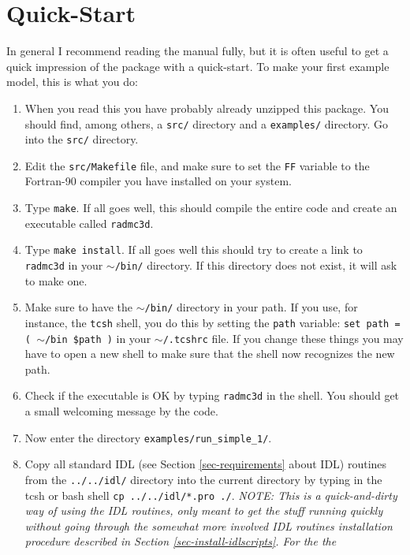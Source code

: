 \documentclass{report}
\begin{document}
\chapter{Quick-Start}\label{chap-quick-start}
In general I recommend reading the manual fully, but it is often useful
to get a quick impression of the package with a quick-start. To make your
first example model, this is what you do:
\begin{enumerate}
\item When you read this you have probably already unzipped this package.
  You should find, among others, a {\small\tt src/} directory and a
  {\small\tt examples/} directory. Go into the {\small\tt src/} directory.
\item Edit the {\small\tt src/Makefile} file, and make sure to set the
  {\small\tt FF} variable to the Fortran-90 compiler you have installed on
  your system.
\item Type {\small\tt make}. If all goes well, this should compile the
  entire code and create an executable called {\small\tt radmc3d}.
\item Type {\small\tt make install}. If all goes well this should try to
  create a link to {\small\tt radmc3d} in your {\small\tt $\sim$/bin/}
  directory. If this directory does not exist, it will ask to make one.
\item Make sure to have the {\small\tt $\sim$/bin/} directory in your path.
  If you use, for instance, the {\small\tt tcsh} shell, you do this by
  setting the {\small\tt path} variable: {\small\tt set path = ( $\sim$/bin
    \$path )} in your {\small\tt $\sim$/.tcshrc} file. If you change these
  things you may have to open a new shell to make sure that the shell now
  recognizes the new path.
\item Check if the executable is OK by typing {\small\tt radmc3d} in the
  shell. You should get a small welcoming message by the code.
\item Now enter the directory {\small\tt examples/run\_simple\_1/}. 
\item Copy all standard IDL (see Section \ref{sec-requirements} about IDL)
  routines from the {\small\tt ../../idl/} directory into the current
  directory by typing in the tcsh or bash shell {\small\tt cp
    ../../idl/*.pro ./}. {\em NOTE: This is a quick-and-dirty way of using
    the IDL routines, only meant to get the stuff running quickly without
    going through the somewhat more involved IDL routines installation
    procedure described in Section \ref{sec-install-idlscripts}. For the the
}
\end{enumerate}
\end{document}
